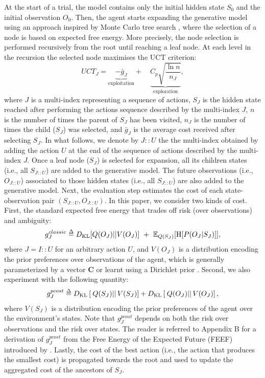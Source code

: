 \documentclass[twoside,11pt]{article}
\newcommand{\kl}[2]{D_{\mathrm{KL}} \left[ \left. \left. #1 \right|\right| #2 \right] }
\def\delequal{\mathrel{\ensurestackMath{\stackon[1pt]{=}{\scriptstyle\Delta}}}}
\begin{document}
At the start of a trial, the model contains only the initial hidden state $S_0$ and the initial observation $O_0$. Then, the agent starts expanding the generative model using an approach inspired by Monte Carlo tree search \citep{6145622}, where the selection of a node is based on expected free energy. More precisely, the node selection is performed recursively from the root until reaching a leaf node. At each level in the recursion the selected node maximises the UCT criterion:
$$UCT_J = \underbrace{- \bar{g}_J}_{\text{exploitation}} +\quad \underbrace{C_p \sqrt{\frac{\ln n}{n_J}}}_{\text{exploration}},$$
where $J$ is a multi-index representing a sequence of actions, $S_J$ is the hidden state reached after performing the actions sequence described by the multi-index $J$, $n$ is the number of times the parent of $S_J$ has been visited, $n_J$ is the number of times the child ($S_J$) was selected, and $\bar{g}_J$ is the average cost received after selecting $S_J$. In what follows, we denote by $J::U$ the the multi-index obtained by adding the action $U$ at the end of the sequence of actions described by the multi-index $J$. Once a leaf node ($S_J$) is selected for expansion, all its children states (i.e., all $S_{J::U}$) are added to the generative model. The future observations (i.e., $O_{J::U}$) associated to those hidden states (i.e., all $S_{J::U}$) are also added to the generative model. Next, the evaluation step estimates the cost of each state-observation pair $(S_{J::U}, O_{J::U})$. In this paper, we consider two kinds of cost. First, the standard expected free energy that trades off risk (over observations) and ambiguity:
$$g^{classic}_J \delequal D_{\mathrm{KL}}[Q(O_J)||V(O_J)]\,\, +\,\, \mathbb{E}_{Q(S_J)}[\text{H}[P(O_J | S_J)]],$$
where $J = I::U$ for an arbitrary action $U$, and $V(O_J)$ is a distribution encoding the prior preferences over observations of the agent, which is generally parameterized by a vector $\bm{C}$ or learnt using a Dirichlet prior \citep{sajid2021exploration}. Second, we also experiment with the following quantity:
$$g^{pcost}_J \delequal \kl{Q(S_J)}{V(S_J)} + \kl{Q(O_J)}{V(O_J)},$$
where $V(S_J)$ is a distribution encoding the prior preferences of the agent over the environment's states. Note that $g^{pcost}_J$ depends on both the risk over observations and the risk over states. The reader is referred to Appendix B for a derivation of $g^{pcost}_J$ from the Free Energy of the Expected Future (FEEF) introduced by \citet{millidge2020expected}. Lastly, the cost of the best action (i.e., the action that produces the smallest cost) is propagated towards the root and used to update the aggregated cost of the ancestors of $S_J$.
\end{document}
